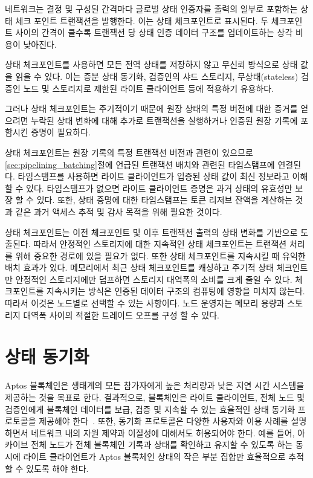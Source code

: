 \documentclass{article}
\begin{document}
네트워크는 결정 및 구성된 간격마다 글로벌 상태 인증자를 출력의 일부로 포함하는 상태 체크 포인트 트랜잭션을 발행한다. 이는 상태 체크포인트로 표시된다. 두 체크포인트 사이의 간격이 클수록 트랜잭션 당 상태 인증 데이터 구조를 업데이트하는 상각 비용이 낮아진다.

상태 체크포인트를 사용하면 모든 전역 상태를 저장하지 않고 무신뢰 방식으로 상태 값을 읽을 수 있다. 이는 증분 상태 동기화, 검증인의 샤드 스토리지, 무상태(stateless) 검증인 노드 및 스토리지로 제한된 라이트 클라이언트 등에 적용하기 유용하다.

그러나 상태 체크포인트는 주기적이기 때문에 원장 상태의 특정 버전에 대한 증거를 얻으려면 누락된 상태 변화에 대해 추가로 트랜잭션을 실행하거나 인증된 원장 기록에 포함시킨 증명이 필요하다.

상태 체크포인트는 원장 기록의 특정 트랜잭션 버전과 관련이 있으므로 \ref{sec:pipelining_batching}절에 언급된 트랜잭션 배치와 관련된 타임스탬프에 연결된다. 타임스탬프를 사용하면 라이트 클라이언트가 입증된 상태 값이 최신 정보라고 이해할 수 있다. 타임스탬프가 없으면 라이트 클라이언트 증명은 과거 상태의 유효성만 보장 할 수 있다. 또한, 상태 증명에 대한 타임스탬프는 토큰 리저브 잔액을 계산하는 것과 같은 과거 액세스 추적 및 감사 목적을 위해 필요한 것이다.

상태 체크포인트는 이전 체크포인트 및 이후 트랜잭션 출력의 상태 변화를 기반으로 도출된다. 따라서 안정적인 스토리지에 대한 지속적인 상태 체크포인트는 트랜잭션 처리를 위해 중요한 경로에 있을 필요가 없다. 또한 상태 체크포인트를 지속시킬 때 유익한 배치 효과가 있다. 메모리에서 최근 상태 체크포인트를 캐싱하고 주기적 상태 체크인트만 안정적인 스토리지에만 덤프하면 스토리지 대역폭의 소비를 크게 줄일 수 있다. 체크포인트를 지속시키는 방식은 인증된 데이터 구조의 컴퓨팅에 영향을 미치지 않는다. 따라서 이것은 노드별로 선택할 수 있는 사항이다. 노드 운영자는 메모리 용량과 스토리지 대역폭 사이의 적절한 트레이드 오프를 구성 할 수 있다.

\section{상태 동기화}
\label{sub:state_sync}

Aptos 블록체인은 생태계의 모든 참가자에게 높은 처리량과 낮은 지연 시간 시스템을 제공하는 것을 목표로 한다. 결과적으로, 블록체인은 라이트 클라이언트, 전체 노드 및 검증인에게 블록체인 데이터를 보급, 검증 및 지속할 수 있는 효율적인 상태 동기화 프로토콜을 제공해야 한다~\cite{evolution_state_sync}. 또한, 동기화 프로토콜은 다양한 사용자와 이용 사례를 설명하면서 네트워크 내의 자원 제약과 이질성에 대해서도 허용되어야 한다. 예를 들어, 아카이브 전체 노드가 전체 블록체인 기록과 상태를 확인하고 유지할 수 있도록 하는 동시에 라이트 클라이언트가 Aptos 블록체인 상태의 작은 부분 집합만 효율적으로 추적할 수 있도록 해야 한다.
\end{document}
